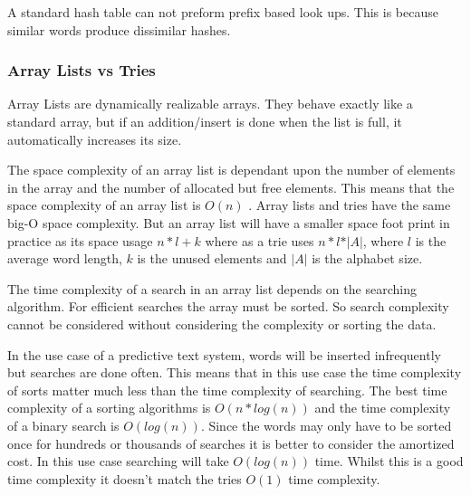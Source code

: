 \documentclass[10pt]{article} %
\begin{document}
			    A standard hash table can not preform prefix based look ups. This is because similar words produce dissimilar hashes.
			    
			\subsubsection{Array Lists vs Tries}
			    Array Lists are dynamically realizable arrays. They behave exactly like a standard array, but if an addition/insert is done when the list is full, it automatically increases its size.
			    
			    The space complexity of an array list is dependant upon the number of elements in the array and the number of allocated but free elements. This means that the space complexity of an array list is 
			    \begin{math} O(n) \end{math} . Array lists and tries have the same big-O space complexity. But an array list will have a smaller space foot print in practice as its space usage \begin{math} n * l + k \end{math} where as a trie uses \begin{math} n * l * \vert A \vert \end{math}, where \begin{math} l \end{math} is the average word length, \begin{math} k \end{math} is the unused elements and \begin{math} \vert A \vert \end{math} is the alphabet size.
			    
			    The time complexity of a search in an array list depends on the searching algorithm. For efficient searches the array must be sorted. So search complexity cannot be considered without considering the complexity or sorting the data.
			    
			    In the use case of a predictive text system, words will be inserted infrequently but searches are done often. This means that in this use case the time complexity of sorts matter much less than the time complexity of searching. The best time complexity of a sorting algorithms is \begin{math} O(n * log(n)) \end{math} and the time complexity of a binary search is \begin{math}O(log(n))\end{math}.
			    Since the words may only have to be sorted once for hundreds or thousands of searches it is better to consider the amortized cost. In this use case searching will take \begin{math}O(log(n))\end{math} time.
			    Whilst this is a good time complexity it doesn't match the tries \begin{math} O(1) \end{math} time complexity.
			    
\end{document}
